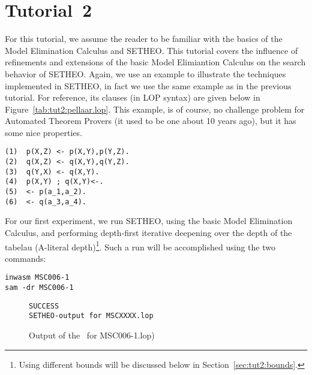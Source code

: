 %

\section*{Tutorial~2}

For this tutorial, we assume the reader to be familiar with the
basics of the Model Elimination Calculus and SETHEO. This 
tutorial covers the influence of refinements and extensions
of the basic Model Elimiantion Calculus on the search behavior of SETHEO.
Again, we use an example to illustrate the techniques implemented in
SETHEO, in fact we use the same example as in the previous tutorial.
For reference, its clauses (in LOP syntax) are given below in 
Figure~\ref{tab:tut2:pellaar.lop}. This example, is of course, no
challenge problem for Automated Theorem Provers
(it used to be one about 10 years ago), but it has some nice 
properties.


\begin{table}[htb]
\begin{center}
\begin{verbatim}
(1)  p(X,Z) <- p(X,Y),p(Y,Z).
(2)  q(X,Z) <- q(X,Y),q(Y,Z).
(3)  q(Y,X) <- q(X,Y).
(4)  p(X,Y) ; q(X,Y)<-.
(5)  <- p(a_1,a_2).
(6)  <- q(a_3,a_4).
\end{verbatim}
\end{center}
\caption{LOP clauses of the Example (file: MSC006-1.lop)}
\label{tab:tut2:pellaar.lop}
\end{table}

For our first experiment, we run SETHEO, using the basic Model Elimination
Calculus, and performing depth-first iterative deepening over the
depth of the tabelau (A-literal depth)\footnote{
	Using different bounds
	will be discussed below in Section~\ref{sec:tut2:bounds}.}.
Such a run will be accomplished using the two commands:

\begin{center}
\begin{verbatim}
inwasm MSC006-1
sam -dr MSC006-1
\end{verbatim}
\end{center}

\begin{figure}[htb]
\begin{center}
\begin{verbatim}
SUCCESS
SETHEO-output for MSCXXXX.lop
\end{verbatim}
\end{center}
\caption{Output of the \SAM\ for MSC006-1.lop)}
\label{fig:tut2:pellaar.pure.log}
\end{figure}


